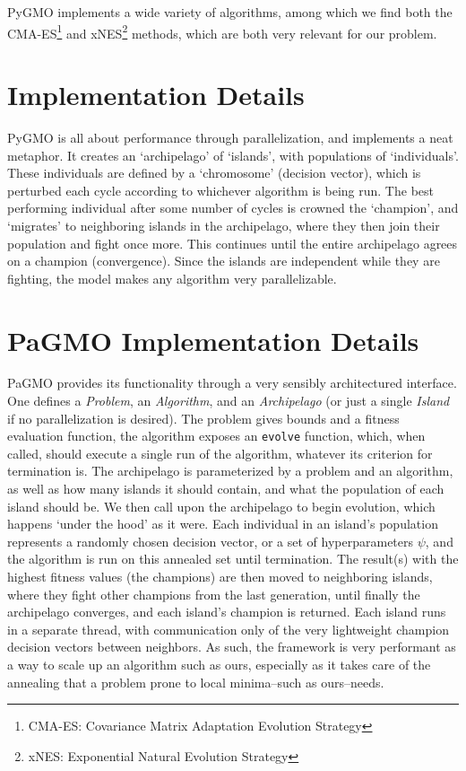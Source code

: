 PyGMO implements a wide variety of algorithms, among which we find both the CMA-ES\footnote{CMA-ES: Covariance Matrix Adaptation Evolution Strategy} and xNES\footnote{xNES: Exponential Natural Evolution Strategy} methods, which are both very relevant for our problem.

\section{Implementation Details} 

PyGMO is all about performance through parallelization, and implements a neat metaphor. It creates an `archipelago' of `islands', with populations of `individuals'. These individuals are defined by a `chromosome' (decision vector), which is perturbed each cycle according to whichever algorithm is being run. The best performing individual after some number of cycles is crowned the `champion', and `migrates' to neighboring islands in the archipelago, where they then join their population and fight once more. This continues until the entire archipelago agrees on a champion (convergence). Since the islands are independent while they are fighting, the model makes any algorithm very parallelizable.

\section{PaGMO Implementation Details}
PaGMO provides its functionality through a very sensibly architectured interface. One defines a \emph{Problem}, an \emph{Algorithm}, and an \emph{Archipelago} (or just a single \emph{Island} if no parallelization is desired). The problem gives bounds and a fitness evaluation function, the algorithm exposes an \texttt{evolve} function, which, when called, should execute a single run of the algorithm, whatever its criterion for termination is. The archipelago is parameterized by a problem and an algorithm, as well as how many islands it should contain, and what the population of each island should be. We then call upon the archipelago to begin evolution, which happens `under the hood' as it were. Each individual in an island's population represents a randomly chosen decision vector, or a set of hyperparameters \(\psi\), and the algorithm is run on this annealed set until termination. The result(s) with the highest fitness values (the champions) are then moved to neighboring islands, where they fight other champions from the last generation, until finally the archipelago converges, and each island's champion is returned. Each island runs in a separate thread, with communication only of the very lightweight champion decision vectors between neighbors. As such, the framework is very performant as a way to scale up an algorithm such as ours, especially as it takes care of the annealing that a problem prone to local minima--such as ours--needs.